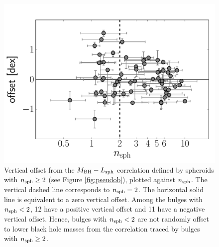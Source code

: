 \documentclass[preprint2]{emulateapj}
\begin{document}
\begin{figure}[h]
\begin{center}
\includegraphics[width=\columnwidth]{images/inset_psb.pdf}
\caption{Vertical offset from the $M_{\rm BH} - L_{\rm sph}$ correlation defined by spheroids with $n_{\rm sph} \geq 2$ (see Figure \ref{fig:pseudob}), 
plotted against $n_{\rm sph}$. 
The vertical dashed line corresponds to $n_{\rm sph} = 2$.
The horizontal solid line is equivalent to a zero vertical offset.
Among the bulges with $n_{\rm sph}<2$, 12 have a positive vertical offset and 11 have a negative vertical offset.
Hence, bulges with $n_{\rm sph}<2$ are not randomly offset to lower black hole masses 
from the correlation traced by bulges with $n_{\rm sph} \geq 2$.}
\label{fig:offset}
\end{center}
\end{figure}
\end{document}
